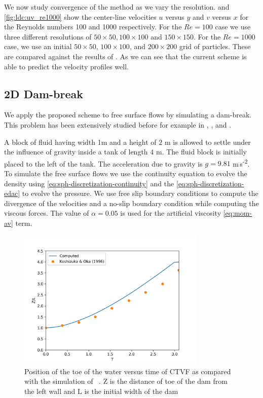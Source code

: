\documentclass[preprint,12pt]{elsarticle}
\begin{document}
We now study convergence of the method as we vary the
resolution.  and \cref{fig:ldc:uv_re1000} show the
center-line velocities $u$ versus $y$ and $v$ versus $x$ for the Reynolds
numbers 100 and 1000 respectively. For the $Re=100$ case we use three
different resolutions of $50\times 50, 100 \times 100$ and $150 \times
150$. For the $Re=1000$ case, we use an initial $50 \times 50$,
$100 \times 100$, and $200 \times 200$ grid of particles. These are compared
against the results of \cite{ldc:ghia-1982}. As we can see that the current
scheme is able to predict the velocity profiles well.


\FloatBarrier%

\subsection{2D Dam-break}

We apply the proposed scheme to free surface flows by simulating a
dam-break. This problem has been extensively studied before for example in
\cite{muta_efficient_2020}, \cite{zhang_hu_adams17}, and
\cite{edac-sph:cf:2019}.

A block of fluid having width 1m and a height of $2$ m is allowed to settle
under the influence of gravity inside a tank of length $4$ m. The fluid block
is initially placed to the left of the tank. The acceleration due to gravity
is $g=9.81$ m\,s\textsuperscript{-2}. To simulate the free surface flows we
use the continuity equation to evolve the density using
\eqref{eq:sph-discretization-continuity} and the
\eqref{eq:sph-discretization-edac} to evolve the pressure. We use free slip
boundary conditions to compute the divergence of the velocities and a no-slip
boundary condition while computing the viscous forces. The value of
$\alpha=0.05$ is used for the artificial viscosity \cref{eq:mom-av} term.

\begin{figure}[!htpb]
  \centering
  \includegraphics[width=0.8\textwidth]{figures/dam_break_2d/etvf_sun2019/x_vs_t}
  \caption{Position of the toe of the water versus time of CTVF as compared
    with the simulation of ~\cite{koshizuka1996moving}. Z is the
    distance of toe of the dam from the left wall and L is the initial width
    of the dam}
\label{fig:dam-break}
\end{figure}
\end{document}
